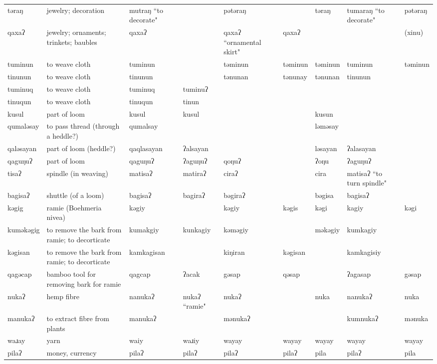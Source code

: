\begin{landscape}
\begin{longtable}{*{9}{p{}}}
\text{*}təraŋ & jewelry; decoration & mutraŋ ``to decorate" &  & pətəraŋ &  & təraŋ & tumaraŋ ``to decorate" & pətəraŋ\\
\text{*}qaxaʔ & jewelry; ornaments; trinkets; baubles & qaxaʔ &  & qaxaʔ ``ornamental skirt" & qaxaʔ &  &  & (xinu)\\
\text{*}tuminun & to weave cloth & tuminun &  & təminun & təminun & təminun & tuminun & təminun\\
\text{*}tinunun & to weave cloth & tinunun &  & tənunan & tənunay & tənunan & tinunun & \\
\text{*}tuminuq & to weave cloth & tuminuq & tuminuʔ &  &  &  &  & \\
\text{*}tinuqun & to weave cloth & tinuqun & tinun &  &  &  &  & \\
\text{*}kusul & part of loom & kusul & kusul &  &  & kusun &  & \\
\text{*}qumaləsay & to pass thread (through a heddle?) & qumalsay &  &  &  & ləməsay &  & \\
\text{*}qaləsayan & part of loom (heddle?) & qaqlasayan & ʔalsayan &  &  & ləsayan & ʔalasayan & \\
\text{*}qaguŋuʔ & part of loom & qaguŋuʔ & ʔaguŋuʔ & qoŋuʔ &  & ʔoŋu & ʔaguŋuʔ & \\
\text{*}tisaʔ & spindle (in weaving) & matisaʔ & matiraʔ & ciraʔ &  & cira & matisaʔ ``to turn spindle" & \\
\text{*}bagisaʔ & shuttle (of a loom) & bagisaʔ & bagiraʔ & bəgiraʔ &  & bəgisa & bagisaʔ & \\
\text{*}kəgig & ramie (Boehmeria nivea) & kəgiy &  & kəgiy & kəgis & kəgi & kagiy & kəgi\\
\text{*}kuməkəgig & to remove the bark from ramie; to decorticate & kumakgiy & kunkagiy & kəməgiy &  & məkəgiy & kumkagiy & \\
\text{*}kəgisan & to remove the bark from ramie; to decorticate & kamkagisan &  & kiŋiran & kəgisan &  & kamkagisiy & \\
\text{*}qagəcap & bamboo tool for removing bark for ramie & qagcap & ʔacak & gəsap & qəsap &  & ʔagasap & gəsap\\
\text{*}nukaʔ & hemp fibre & nanukaʔ & nukaʔ ``ramie" & nukaʔ &  & nuka & nanukaʔ & nuka\\
\text{*}manukaʔ & to extract fibre from plants & manukaʔ &  & mənukaʔ &  &  & kumnukaʔ & mənuka\\
\text{*}waɹay & yarn & waiy & waɹiy & wayay & wayay & wayay & wayay & wayay\\
\text{*}pilaʔ & money, currency & pilaʔ & pilaʔ & pilaʔ & pilaʔ & pila & pilaʔ & pila\\

\end{longtable}
\end{landscape}
